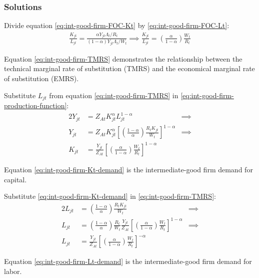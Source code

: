 \documentclass[
	12pt,
	]{article}
\numberwithin{equation}{section}
\theoremstyle{definition}
\theoremstyle{plain}
\theoremstyle{plain}
\theoremstyle{plain}
\begin{document}
\subsubsection*{Solutions}

Divide equation \ref{eq:int-good-firm-FOC-Kt} by \ref{eq:int-good-firm-FOC-Lt}:
\begin{align}
	\frac{K_{jt}}{L_{jt}} = \frac{\alpha Y_{jt} \Lambda_t /R_t}{(1-\alpha) Y_{jt} \Lambda_t /W_t} \implies
	\frac{K_{jt}}{L_{jt}} = \left( \frac{\alpha}{1-\alpha} \right) \frac{W_t}{R_t} \label{eq:int-good-firm-TMRS}
\end{align}

Equation \ref{eq:int-good-firm-TMRS} demonstrates the relationship between the technical marginal rate of substitution (TMRS) and the economical marginal rate of substitution (EMRS). 

Substitute $L_{jt}$ from equation \ref{eq:int-good-firm-TMRS} in \ref{eq:int-good-firm-production-function}:
\begin{alignat}{2}
	Y_{jt} & = Z_{At} K_{jt}^\alpha L_{jt}^{1-\alpha} &\implies \nonumber \\
	Y_{jt} & = Z_{At} K_{jt}^\alpha \left[ \left( \frac{1-\alpha}{\alpha} \right) \frac{R_t K_{jt}}{W_t} \right]^{1-\alpha} &\implies \nonumber \\
	K_{jt} & = \frac{Y_{jt}}{Z_{At}} \left[ \left( \frac{\alpha}{1-\alpha} \right) \frac{W_t}{R_t}\right]^{1-\alpha} \label{eq:int-good-firm-Kt-demand}
\end{alignat}

Equation \ref{eq:int-good-firm-Kt-demand} is the intermediate-good firm demand for capital. 

Substitute \ref{eq:int-good-firm-Kt-demand} in \ref{eq:int-good-firm-TMRS}:
\begin{alignat}{2}
	L_{jt} & = \left( \frac{1-\alpha}{\alpha} \right) \frac{R_t K_{jt}}{W_t} &\implies \nonumber \\
	L_{jt} & = \left( \frac{1-\alpha}{\alpha} \right) \frac{R_t}{W_t} \frac{Y_{jt}}{Z_{At}} \left[ \left( \frac{\alpha}{1-\alpha} \right) \frac{W_t}{R_t}\right]^{1-\alpha} &\implies \nonumber \\
	L_{jt} & = \frac{Y_{jt}}{Z_{At}} \left[ \left( \frac{\alpha}{1-\alpha} \right) \frac{W_t}{R_t}\right]^{-\alpha} \label{eq:int-good-firm-Lt-demand}
\end{alignat}

Equation \ref{eq:int-good-firm-Lt-demand} is the intermediate-good firm demand for labor.
\end{document}
